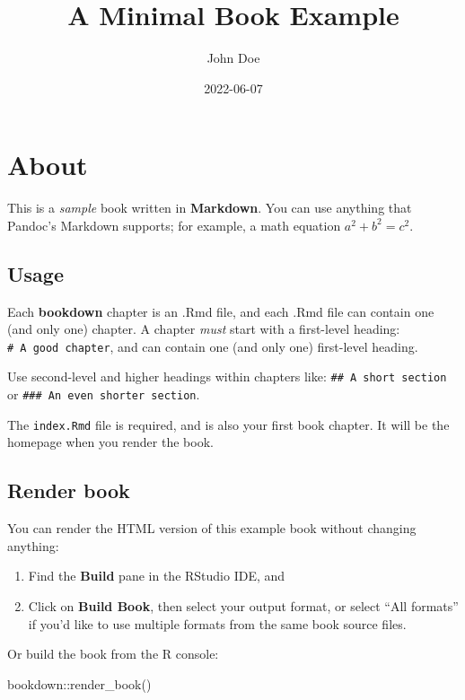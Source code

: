 \documentclass[
]{book}
\title{A Minimal Book Example}
\author{John Doe}
\date{2022-06-07}
\newenvironment{Shaded}{\begin{snugshade}}{\end{snugshade}}
\newcommand{\FunctionTok}[1]{\textcolor[rgb]{0.00,0.00,0.00}{#1}}
\newcommand{\NormalTok}[1]{#1}
\newcommand{\SpecialCharTok}[1]{\textcolor[rgb]{0.00,0.00,0.00}{#1}}
\theoremstyle{definition}
\theoremstyle{definition}
\theoremstyle{definition}
\theoremstyle{definition}
\theoremstyle{remark}
\begin{document}
\maketitle

{
\setcounter{tocdepth}{1}
\tableofcontents
}
\hypertarget{about}{%
\chapter{About}\label{about}}

This is a \emph{sample} book written in \textbf{Markdown}. You can use anything that Pandoc's Markdown supports; for example, a math equation \(a^2 + b^2 = c^2\).

\hypertarget{usage}{%
\section{Usage}\label{usage}}

Each \textbf{bookdown} chapter is an .Rmd file, and each .Rmd file can contain one (and only one) chapter. A chapter \emph{must} start with a first-level heading: \texttt{\#\ A\ good\ chapter}, and can contain one (and only one) first-level heading.

Use second-level and higher headings within chapters like: \texttt{\#\#\ A\ short\ section} or \texttt{\#\#\#\ An\ even\ shorter\ section}.

The \texttt{index.Rmd} file is required, and is also your first book chapter. It will be the homepage when you render the book.

\hypertarget{render-book}{%
\section{Render book}\label{render-book}}

You can render the HTML version of this example book without changing anything:

\begin{enumerate}
\def\labelenumi{\arabic{enumi}.}
\item
  Find the \textbf{Build} pane in the RStudio IDE, and
\item
  Click on \textbf{Build Book}, then select your output format, or select ``All formats'' if you'd like to use multiple formats from the same book source files.
\end{enumerate}

Or build the book from the R console:

\begin{Shaded}
\begin{Highlighting}[]
\NormalTok{bookdown}\SpecialCharTok{::}\FunctionTok{render\_book}\NormalTok{()}
\end{Highlighting}
\end{Shaded}
\end{document}
